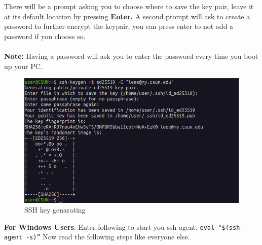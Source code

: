 \documentclass[12pt, a4paper]{article}
\begin{document}
\noindent There will be a prompt asking you to choose where to save the key pair, leave it at its default location by pressing \textbf{Enter.} A second prompt will ask to create a password to further encrypt the keypair, you can press enter to not add a password if you choose so.\\\\
\textbf{Note:} Having a password will ask you to enter the password every time you boot up your PC. \\

\begin{figure}[H]
\centering
\includegraphics[scale=0.4]{../images/workshop-I/key-gen.png}
\caption{SSH key genarating}
\end{figure}

\noindent\textbf{For Windows Users}: Enter following to start you ssh-agent: \texttt{eval "\$(ssh-agent -s)”} Now read the following steps like everyone else.\\
\end{document}
